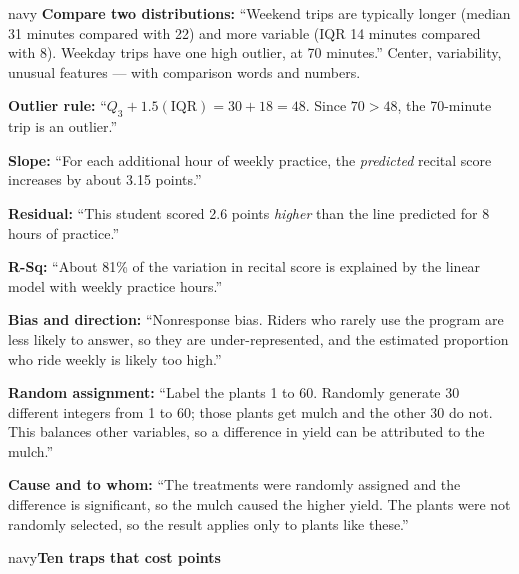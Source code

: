 \documentclass[12pt]{article}
\newcommand{\sghead}[2][10]{%
  \vspace{0.13in}
  \boxguard[#1]
  \begin{headlinebox}{navy}\color{white}\bfseries\small #2\end{headlinebox}
  \vspace{0.09in}}
\begin{document}
\vspace{0.10in}
\boxguard[22]
\begin{scenariobox}{navy}
\small
\textbf{Compare two distributions:} ``Weekend trips are typically longer (median 31 minutes
compared with 22) and more variable (IQR 14 minutes compared with 8). Weekday trips have one
high outlier, at 70 minutes.'' Center, variability, unusual features --- with comparison words
and numbers.\par\vspace{3pt}
\textbf{Outlier rule:} ``$Q_3 + 1.5(\text{IQR}) = 30 + 18 = 48$. Since $70 > 48$, the 70-minute
trip is an outlier.''\par\vspace{3pt}
\textbf{Slope:} ``For each additional hour of weekly practice, the \emph{predicted} recital score
increases by about 3.15 points.''\par\vspace{3pt}
\textbf{Residual:} ``This student scored 2.6 points \emph{higher} than the line predicted for 8
hours of practice.''\par\vspace{3pt}
\textbf{R-Sq:} ``About 81\% of the variation in recital score is explained by the linear model
with weekly practice hours.''\par\vspace{3pt}
\textbf{Bias and direction:} ``Nonresponse bias. Riders who rarely use the program are less
likely to answer, so they are under-represented, and the estimated proportion who ride weekly is
likely too high.''\par\vspace{3pt}
\textbf{Random assignment:} ``Label the plants 1 to 60. Randomly generate 30 different integers
from 1 to 60; those plants get mulch and the other 30 do not. This balances other variables, so
a difference in yield can be attributed to the mulch.''\par\vspace{3pt}
\textbf{Cause and to whom:} ``The treatments were randomly assigned and the difference is
significant, so the mulch caused the higher yield. The plants were not randomly selected, so the
result applies only to plants like these.''
\end{scenariobox}

\sghead{Ten traps that cost points}
\end{document}
